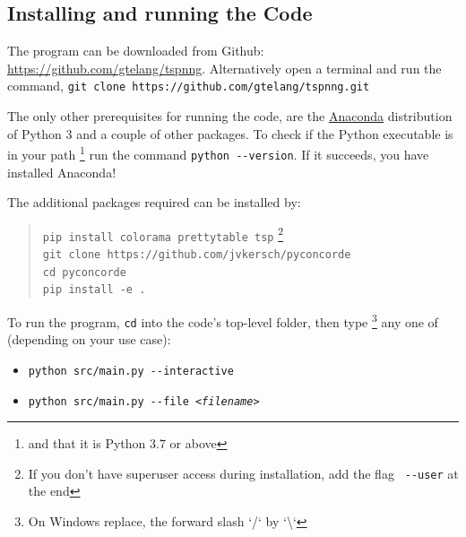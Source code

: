 \begin{appendices}

\newpage
\section{Installing and running the Code}
\label{sec:install}

The program can be downloaded from Github: \url{https://github.com/gtelang/tspnng}. Alternatively
open a terminal and run the command, \texttt{git clone https://github.com/gtelang/tspnng.git}

The only other prerequisites for running the code, are the 
\href{https://www.anaconda.com/products/individual}{Anaconda} distribution of Python 3 
and a couple of other packages.  To check if the Python executable is in your path \footnote{and that it is Python 3.7 or above}
run the command \verb|python --version|. If it succeeds, you have installed Anaconda! 

The additional packages required can be installed by: 

\begin{quote}
\color{blue}
\texttt{pip install colorama prettytable tsp} \footnote{If you don't have superuser access during installation, add the flag \texttt{\color{red} \texttt{-{}-}user} at the end}   \\
\texttt{git clone https://github.com/jvkersch/pyconcorde} \\
\texttt{cd pyconcorde}\\
\texttt{pip install -e .}
\end{quote}


To run the program, \texttt{cd} into the code's top-level folder, then type \footnote{On Windows replace, the forward slash `/` by `\textbackslash`}
any one of (depending on your use case): 


{\LARGE \color{alizarin}
\begin{itemize}
\item \texttt{python src/main.py \textit{-}\textit{-}interactive}
\item \texttt{python src/main.py \textit{-}\textit{-}file \textit{<filename>}} 
\end{itemize}
}


\end{appendices}
